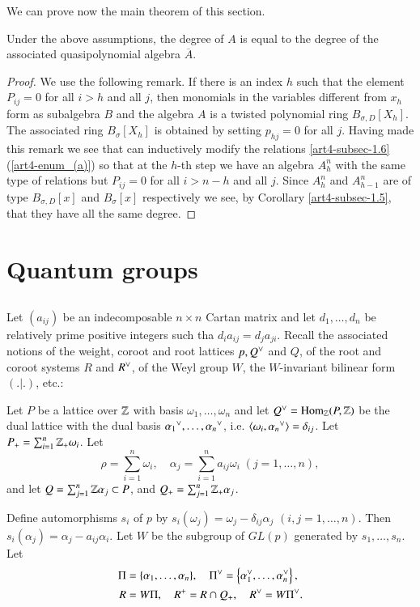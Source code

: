 We can prove now the main theorem of this section.

\begin{theorem*}
Under the above assumptions, the degree of $A$ is equal to the degree of the associated quasipolynomial algebra $\overline{A}$. 
\end{theorem*}

\begin{proof}
We use the following remark. If there is an index $h$ such that the element $P_{ij} =0$ for all $i> h$ and all $j$, then monomials in the variables different from $x_{h}$ form as subalgebra $B$ and the algebra $A$ is a twisted polynomial ring $B_{\sigma, D}[X_{h}]$. The associated ring $B_{\sigma}[X_{h}]$ is obtained by setting $p_{hj} = 0$ for all $j$. Having made this remark we see that can inductively modify the relations \ref{art4-subsec-1.6}(\ref{art4-enum_(a)}) so that at the $h$-th step we have an algebra $A_{h}^{n}$ with the same type of relations but $P_{ij} = 0$ for all $i>n-h$ and all $j$. Since $A_{h}^{n}$ and $A_{h-1}^{n}$ are of type $B_{\sigma, D}[x]$ and $B_{\sigma}[x]$ respectively we see, by Corollary \ref{art4-subsec-1.5}, that they have all the same degree. 
\end{proof}

\section{Quantum groups}

\subsection{}\label{art4-subsec-2.1}
Let $(a_{ij})$ be an indecomposable $n\times n $ Cartan matrix and let $d_{1}, \ldots, d_{n}$ be relatively prime positive integers such tha $d_{i}a_{ij} = d_{j}a_{ji}$. Recall the associated notions of the weight, coroot and root lattices $p,Q\spcheck$ and $Q$, of the root and coroot systems $R$ and $R\spcheck$, of the Weyl group $W$, the $W$-invariant bilinear form $(.|.)$, etc.:  

Let $P$ be a lattice over $\mathbb{Z}$ with basis $\omega_{1},\ldots, \omega_{n}$ and let $Q\spcheck = \Hom_{\bbZ}(P, \bbZ)$ be the dual lattice with the dual basis $\alpha_{1}{\spcheck}, \ldots, \alpha_{n}{\spcheck}$, i.e. $\langle \omega_{i}, \alpha_{n}{\spcheck}\rangle = \delta_{ij}$. Let $P_{+}= \sum_{i=1}^{n} \mathbb{Z}_{+}\omega_{i}$. Let 
 $$
 \rho = \sum\limits_{i=1}^{n} \omega_{i},\quad \alpha_{j} = \sum\limits_{i=1}^{n}a_{ij}\omega_{i}\;(j=1,\ldots, n),
$$
and let $Q=\sum_{j=1}^{n}\mathbb{Z}\alpha_{j} \subset P$, and $Q_{+} = \sum_{j=1}^{n}\mathbb{Z}_{+}\alpha_{j}$.

Define automorphisms $s_{i}$ of $p$ by $s_{i}(\omega_{j}) = \omega_{j}-\delta_{ij}\alpha_{j}$ $(i,j = 1, \ldots, n)$.
Then $s_{i}(\alpha_{j}) = \alpha_{j}-a_{ij}\alpha_{i}$. Let $W$ be the subgroup of $GL(p)$ generated by $s_{1}, \ldots, s_{n}$. Let
\begin{align*}
\Pi &= \{\alpha_{1}, \ldots, \alpha_{n}\}, \quad \Pi\spcheck = \left\{\alpha_{1}\spcheck, \ldots, \alpha_{n}\spcheck\right\},\\
 R &= W\Pi,\quad R^{+} = R\cap Q_{+},\quad R\spcheck = W\Pi\spcheck . 
\end{align*}
